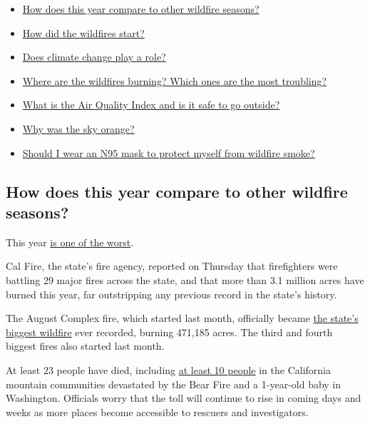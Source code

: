 \begin{itemize}
\tightlist
\item
  \protect\hyperlink{link-2930ac44}{How does this year compare to other
  wildfire seasons?}
\item
  \protect\hyperlink{link-42b22137}{How did the wildfires start?}
\item
  \protect\hyperlink{link-aec82cb}{Does climate change play a role?}
\item
  \protect\hyperlink{link-1ca35169}{Where are the wildfires burning?
  Which ones are the most troubling?}
\item
  \protect\hyperlink{link-3db5b9c6}{What is the Air Quality Index and is
  it safe to go outside?}
\item
  \protect\hyperlink{link-6c4b976}{Why was the sky orange?}
\item
  \protect\hyperlink{link-3cde46e0}{Should I wear an N95 mask to protect
  myself from wildfire smoke?}
\end{itemize}

\hypertarget{how-does-this-year-compare-to-other-wildfire-seasons}{%
\subsection{How does this year compare to other wildfire
seasons?}\label{how-does-this-year-compare-to-other-wildfire-seasons}}

This year
\href{https://www.nytimes3xbfgragh.onion/2020/08/25/us/california-fires-why-this-year-is-different.html}{is
one of the worst}.

Cal Fire, the state's fire agency, reported on Thursday that
firefighters were battling 29 major fires across the state, and that
more than 3.1 million acres have burned this year, far outstripping any
previous record in the state's history.

The August Complex fire, which started last month, officially became
\href{https://www.fire.ca.gov/media/11416/top20_acres.pdf}{the state's
biggest wildfire} ever recorded, burning 471,185 acres. The third and
fourth biggest fires also started last month.

At least 23 people have died, including
\href{https://www.nytimes3xbfgragh.onion/2020/09/10/us/fires-oregon-california-wa-state.html?name=styln-california-wildfires\&region=TOP_BANNER\&block=storyline_menu_recirc\&action=click\&pgtype=Article\&impression_id=82af8ab0-f443-11ea-afe2-79a10f00ab83\&variant=1_Show\#link-790daaac}{at
least 10 people} in the California mountain communities devastated by
the Bear Fire and a 1-year-old baby in Washington. Officials worry that
the toll will continue to rise in coming days and weeks as more places
become accessible to rescuers and investigators.

